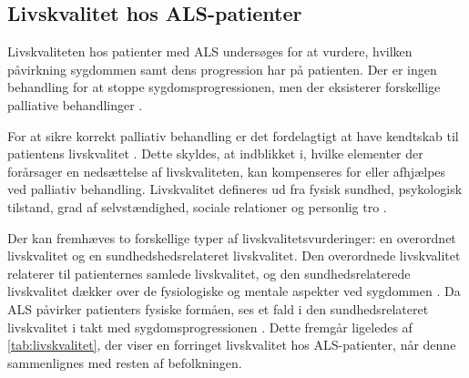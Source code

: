 \subsection{Livskvalitet hos ALS-patienter}
Livskvaliteten hos patienter med ALS undersøges for at vurdere, hvilken påvirkning sygdommen samt dens progression har på patienten. Der er ingen behandling for at stoppe sygdomsprogressionen, men der eksisterer forskellige palliative behandlinger \citep{neudert2004}. 

For at sikre korrekt palliativ behandling er det fordelagtigt at have kendtskab til patientens livskvalitet \citep{ilse2015}.
Dette skyldes, at indblikket i, hvilke elementer der forårsager en nedsættelse af livskvaliteten, kan kompenseres for eller afhjælpes ved palliativ behandling. 
Livskvalitet defineres ud fra fysisk sundhed, psykologisk tilstand, grad af selvstændighed, sociale relationer og personlig tro \citep{pagnini2013}.

Der kan fremhæves to forskellige typer af livskvalitetsvurderinger: en overordnet livskvalitet og en sundhedshedsrelateret livskvalitet. 
Den overordnede livskvalitet relaterer til patienternes samlede livskvalitet, og den sundhedsrelaterede livskvalitet dækker over de fysiologiske og mentale aspekter ved sygdommen \citep{ilse2015, neudert2004}. Da ALS påvirker patienters fysiske formåen, ses et fald i den sundhedsrelateret livskvalitet i takt med sygdomsprogressionen \citep{ilse2015}. Dette fremgår ligeledes af \autoref{tab:livskvalitet}, der viser en forringet livskvalitet hos ALS-patienter, når denne sammenlignes med resten af befolkningen. 


